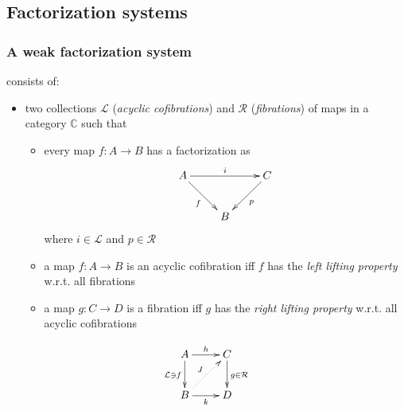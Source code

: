 \documentclass[dvipdfmx]{beamer}
\begin{document}

\subsection{Factorization systems}

\begin{frame}
  \frametitle{A weak factorization system
  \nocite{warren2008homotopy,awodey2007homotopy}}
  consists of:
  \begin{itemize}
    \item two collections ${\mathcal L}$ ({\it acyclic cofibrations})
      and ${\mathcal R}$ ({\it fibrations})
      of maps in a category ${\mathbb C}$
      such that
      \begin{itemize}
        \item every map $f : A \to B$ has a factorization as
          \[
            \xymatrix{
              A \ar[rr]^{i} \ar[dr]_{f}
              &
              & C \ar[dl]^{p}
              \\
              & B
              &
            }
          \]
          where $i \in {\mathcal L}$ and $p \in {\mathcal R}$
        \item a map $f : A \to B$ is an acyclic cofibration iff
          $f$ has the {\it left lifting property} w.r.t.
          all fibrations
        \item a map $g : C \to D$ is a fibration iff
          $g$ has the {\it right lifting property} w.r.t.
          all acyclic cofibrations
      \end{itemize}
  \end{itemize}
  \[
    \xymatrix{
      A \ar[r]^{h} \ar[d]_{ {\mathcal L} \ni f}
      & C \ar[d]^{g \in {\mathcal R}}
      \\
      B \ar[r]_{k} \ar@{.>}[ur]^{J}
      & D
    }
  \]
\end{frame}
\end{document}
